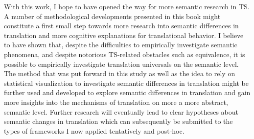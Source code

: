 With this work, I hope to have opened the way for more semantic research in TS. A number of methodological developments presented in this book might constitute a first small step towards more research into semantic differences in translation and more cognitive explanations for translational behavior. I believe to have shown that, despite the difficulties to empirically investigate semantic phenomena, and despite notorious TS-related obstacles such as equivalence, it is possible to empirically investigate translation universals on the semantic level. The method that was put forward in this study as well as the idea to rely on statistical visualization to investigate semantic differences in translation might be further used and developed to explore semantic differences in translation and gain more insights into the mechanisms of translation on more a more abstract, semantic level. Further research will eventually lead to clear hypotheses about semantic changes in translation which can subsequently be submitted to the types of frameworks I now applied tentatively and post-hoc.
